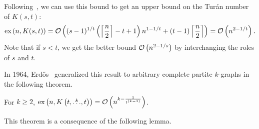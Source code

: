 \begin{remark} \label{rem:kst_asymptotic}
    Following~, we can use this bound to get an upper bound on the Turán number of $K(s, t)$:
    \[
        \text{ex} \left( n, K(s, t) \right) =
        \mathcal{O}\left((s - 1)^{1 / t}\left(\left\lceil\frac{n}{2}\right\rceil - t + 1\right)n^{1 - 1 / t} + (t - 1)\left\lceil\frac{n}{2}\right\rceil\right) =
        \mathcal{O}\left(n^{2 - 1 / t}\right).
    \]
    Note that if $s < t$, we get the better bound $\mathcal{O}\left(n^{2 - 1 / s}\right)$ by interchanging the roles of $s$ and $t$.
\end{remark}

In 1964, Erdős~\cite{Erods1964} generalized this result to arbitrary complete partite $k$-graphs in the following theorem.

\begin{theorem}\label{thm:erdos64}
    For $k \geq 2$,
    $\text{ex} \left( n, K\left(t, \overset{k}{\dots}, t\right) \right) = \mathcal{O}\left(n^{k - \frac{1}{t^{(k-1)}}}\right)$.
\end{theorem}

This theorem is a consequence of the following lemma.

